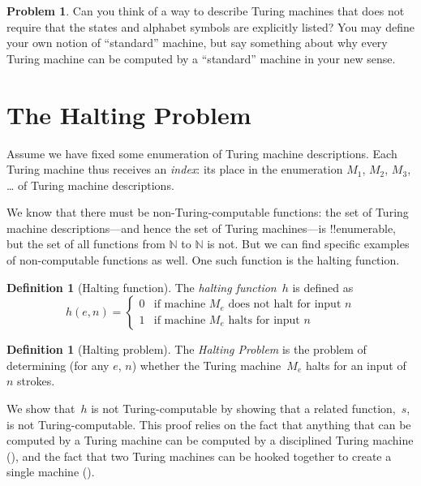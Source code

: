 \documentclass[10pt,a4paper]{article}
\makeatletter
\theoremstyle{plain}
\theoremstyle{definition}
\newtheorem{defn}[thm]{Definition}
\newtheorem{prob}{Problem}[section]
\theoremstyle{remark}
\newenvironment{explain}{}{}
\newcommand*{\olfileid}[3]{}
\newcommand*{\olsection}[1]{\section*{#1}}
\newcommand{\olref}{\@ifnextchar[{\olref@i}{\olref@final}}
\def\olref@i[#1]{\@ifnextchar[{\olref@ii}{\olref@final}}
\def\olref@ii[#1]{\@ifnextchar[{\olref@iii}{\olref@final}}
\def\olref@iii[#1]{\olref@final}
\def\olref@final#1{\ref{#1}}
\providecommand{\Nat}{\ensuremath{\mathbb{N}}}
\makeatother
\begin{document}
\begin{prob}
  Can you think of a way to describe Turing machines that does not
  require that the states and alphabet symbols are explicitly listed?
  You may define your own notion of ``standard'' machine, but say
  something about why every Turing machine can be computed by a
  ``standard'' machine in your new sense.
\end{prob}





\olfileid{tur}{und}{hal}
\olsection{The Halting Problem}

\begin{explain}
Assume we have fixed some enumeration of Turing machine
descriptions.  Each Turing machine thus receives an \emph{index}: its
place in the enumeration $M_1$, $M_2$, $M_3$, \dots{} of Turing machine
descriptions.

We know that there must be non-Turing-computable functions: the set of
Turing machine descriptions---and hence the set of Turing machines---is
!!{enumerable}, but the set of all functions from $\Nat$ to $\Nat$ is
not. But we can find specific examples of non-computable functions as
well. One such function is the halting function.
\end{explain}

\begin{defn}[Halting function]
 The \emph{halting function}~$h$ is defined as
\[
h(e,n) =
\begin{cases}
  \text{0} & \text{if machine~$M_e$ does not halt for input $n$} \\
  \text{1} & \text{if machine~$M_e$ halts for input $n$}
\end{cases}
\]
\end{defn}

\begin{defn}[Halting problem]
The \emph{Halting Problem} is the problem of determining (for any $e$, $n$)
whether the Turing machine~$M_e$ halts for an input of~$n$ strokes.
\end{defn}

\begin{explain}
We show that~$h$ is not Turing-computable by showing that a related
function,~$s$, is not Turing-computable. This proof relies on the fact
that anything that can be computed by a Turing machine can be computed
by a disciplined Turing machine (\olref[mac][dis]{sec}), and the fact
that two Turing machines can be hooked together to create a single
machine (\olref[mac][cmb]{sec}).
\end{explain}
\end{document}
